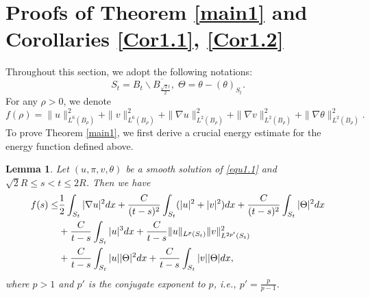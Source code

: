 \documentclass[11pt,reqno]{amsart}
\newtheorem{Lem}{Lemma}[section]
\numberwithin{Thm}{section}
\begin{document}
\section{Proofs of Theorem \ref{main1} and Corollaries \ref{Cor1.1}, \ref{Cor1.2}  }\label{sec3}
Throughout this section, we adopt the following notations:
$$S_t=B_t\backslash \overline{B_\frac{\sqrt{2}t}{2}},\;\Theta=\theta-(\theta)_{S_t}.$$
For any $\rho>0$, we denote
\begin{equation}\label{ine3.1}
f(\rho)=\|u\|_{L^6 (B_\rho)}^2+\|v\|_{L^6 (B_\rho)}^2+\|\nabla u\|_{L^2 (B_\rho)}^2+\|\nabla v\|_{L^2 (B_\rho)}^2+\|\nabla \theta\|_{L^2 (B_\rho)}^2.
\end{equation}
To prove Theorem \ref{main1}, we first derive a crucial energy estimate for the energy function defined above.
\begin{Lem}\label{Lem3.1}
Let $(u,\pi,v,\theta)$ be a smooth solution of \eqref{equ1.1} and $\sqrt{2}R\leq s<t\leq 2R$.
Then we have
\begin{align}
f(s)\leq&\frac{1}{2}\int_{S_t}|\nabla u|^2dx+\frac{C}{(t-s)^2}\int_{S_t}(|u|^2+|v|^2) d x+\frac{C}{(t-s)^2}\int_{S_t}|\Theta|^2 d x\notag\\
&+\frac{C}{t-s} \int_{S_t}|u|^3  d x+\frac{C}{t-s}\|u\|_{L^p(S_t)}\|v\|_{L^{2p'}(S_t)}^2\label{ine3.2}\\
&+\frac{C}{t-s}\int_{S_t}|u||\Theta|^2dx+\frac{C}{t-s}\int_{S_t}|v||\Theta|dx,\notag
\end{align}
where $p>1$ and $p'$ is the conjugate exponent to $p$, i.e., $p'=\frac{p}{p-1}$.
\end{Lem}
\end{document}

